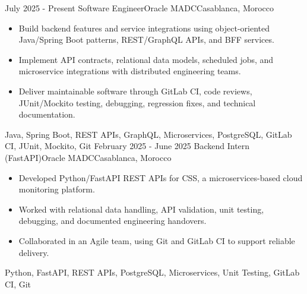 
\begin{experiences}
  \experience
    {July 2025 - Present}
    {Software Engineer}{Oracle MADC}{Casablanca, Morocco}
    {} {
      \begin{itemize}
        \item Build backend features and service integrations using object-oriented Java/Spring Boot patterns, REST/GraphQL APIs, and BFF services.
        \item Implement API contracts, relational data models, scheduled jobs, and microservice integrations with distributed engineering teams.
        \item Deliver maintainable software through GitLab CI, code reviews, JUnit/Mockito testing, debugging, regression fixes, and technical documentation.
      \end{itemize}
    }
    {Java, Spring Boot, REST APIs, GraphQL, Microservices, PostgreSQL, GitLab CI, JUnit, Mockito, Git}
  \experience
    {February 2025 - June 2025}
    {Backend Intern (FastAPI)}{Oracle MADC}{Casablanca, Morocco}
    {} {
      \begin{itemize}
        \item Developed Python/FastAPI REST APIs for CSS, a microservices-based cloud monitoring platform.
        \item Worked with relational data handling, API validation, unit testing, debugging, and documented engineering handovers.
        \item Collaborated in an Agile team, using Git and GitLab CI to support reliable delivery.
      \end{itemize}
    }
    {Python, FastAPI, REST APIs, PostgreSQL, Microservices, Unit Testing, GitLab CI, Git}
  \emptySeparator
\end{experiences}
